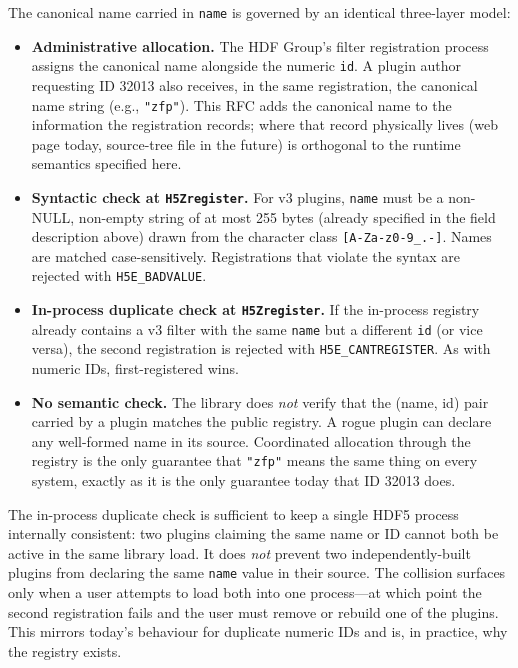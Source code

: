 \documentclass[../RFC-HDFG-2026-001.tex]{subfiles}
\begin{document}

The canonical name carried in \texttt{name} is governed by an
identical three-layer model:

\begin{itemize}
\item \textbf{Administrative allocation.}  The HDF Group's filter
  registration process assigns the canonical name alongside the
  numeric \texttt{id}.  A plugin author requesting ID 32013 also
  receives, in the same registration, the canonical name string
  (e.g., \texttt{"zfp"}).  This RFC adds the canonical name to the
  information the registration records; where that record physically
  lives (web page today, source-tree file in the future) is orthogonal
  to the runtime semantics specified here.
\item \textbf{Syntactic check at \texttt{H5Zregister}.}  For v3
  plugins, \texttt{name} must be a non-NULL, non-empty string of at
  most 255 bytes (already specified in the field description above)
  drawn from the character class \texttt{[A-Za-z0-9\_.-]}.  Names are
  matched case-sensitively.  Registrations that violate the syntax are
  rejected with \texttt{H5E\_BADVALUE}.
\item \textbf{In-process duplicate check at \texttt{H5Zregister}.}  If
  the in-process registry already contains a v3 filter with the same
  \texttt{name} but a different \texttt{id} (or vice versa), the
  second registration is rejected with \texttt{H5E\_CANTREGISTER}.  As
  with numeric IDs, first-registered wins.
\item \textbf{No semantic check.}  The library does \emph{not} verify
  that the (name, id) pair carried by a plugin matches the public
  registry.  A rogue plugin can declare any well-formed name in its
  source.  Coordinated allocation through the registry is the only
  guarantee that \texttt{"zfp"} means the same thing on every system,
  exactly as it is the only guarantee today that ID 32013 does.
\end{itemize}


The in-process duplicate check is sufficient to keep a single HDF5
process internally consistent: two plugins claiming the same name or
ID cannot both be active in the same library load.  It does \emph{not}
prevent two independently-built plugins from declaring the same
\texttt{name} value in their source.  The collision surfaces only
when a user attempts to load both into one process---at which point
the second registration fails and the user must remove or rebuild one
of the plugins.  This mirrors today's behaviour for duplicate numeric
IDs and is, in practice, why the registry exists.
\end{document}
